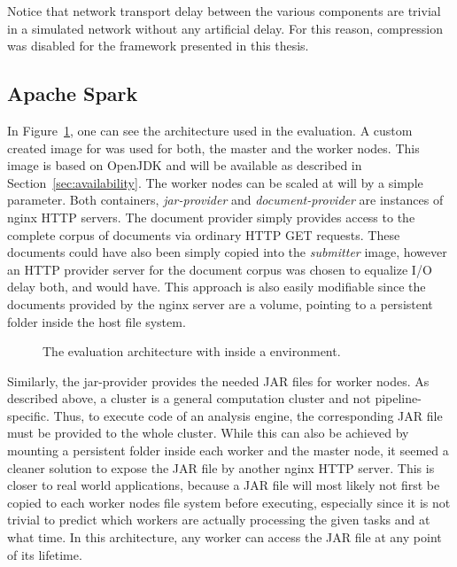 Notice that network transport delay between the various components are trivial in a simulated network without any artificial delay. For this reason, compression was disabled for the framework presented in this thesis.
\subsection{Apache Spark}
\label{ssec:spark}
In Figure~\ref{fig:arch-spark}, one can see the \docker{} architecture used in the evaluation. A custom created image for \spark{} was used for both, the master and the worker nodes. This image is based on OpenJDK and will be available as described in Section~\ref{sec:availability}. The \spark{} worker nodes can be scaled at will by a simple \docker{} parameter. Both containers, \emph{jar-provider} and \emph{document-provider} are  instances of nginx HTTP servers. The document provider simply provides access to the complete corpus of documents via ordinary HTTP GET requests. These documents could have also been simply copied into the \emph{submitter} image, however an HTTP provider server for the document corpus was chosen to equalize I/O delay both, \uimaas{} and \spark{} would have. This approach is also easily modifiable since the documents provided by the nginx server are a volume, pointing to a persistent folder inside the host file system.
\begin{figure}[tbh]
	\centering
	
	\caption[The evaluation architecture with Spark inside a Docker environment.]{The evaluation architecture with \spark{} inside a \docker{} environment.}
	\label{fig:arch-spark}
\end{figure}
Similarly, the jar-provider provides the needed JAR files for \spark{} worker nodes. As described above, a \spark{} cluster is a general computation cluster and not pipeline-specific. Thus, to execute code of an analysis engine, the corresponding JAR file must be provided to the whole cluster. While this can also be achieved by mounting a persistent folder inside each worker and the master node, it seemed a cleaner solution to expose the JAR file by another nginx HTTP server. This is closer to real world applications, because a JAR file will most likely not first be copied to each worker nodes file system before executing, especially since it is not trivial to predict which workers are actually processing the given tasks and at what time. In this architecture, any worker can access the JAR file at any point of its lifetime.

